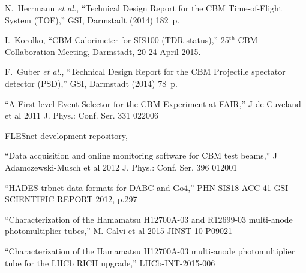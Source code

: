 \begin{thebibliography}{99}
N.~Herrmann {\it et al.}, ``Technical Design Report for the CBM Time-of-Flight System (TOF),'' GSI, Darmstadt (2014) 182~p.

I.~Korolko, ``CBM Calorimeter for SIS100 (TDR status),'' 25$^\mathrm{th}$ CBM Collaboration Meeting, Darmstadt, 20-24 April 2015.\\

F.~Guber {\it et al.}, ``Technical Design Report for the CBM Projectile spectator detector (PSD),'' GSI, Darmstadt (2014) 78~p.



``A First-level Event Selector for the CBM Experiment at FAIR,''
J de Cuveland et al 2011 J. Phys.: Conf. Ser. 331 022006

FLESnet development repository,

``Data acquisition and online monitoring software for CBM test beams,''
J Adamczewski-Musch et al 2012 J. Phys.: Conf. Ser. 396 012001

``HADES trbnet data formats for DABC and Go4,''
PHN-SIS18-ACC-41
GSI SCIENTIFIC REPORT 2012, p.297


``Characterization of the Hamamatsu H12700A-03 and R12699-03 multi-anode photomultiplier tubes,''
M. Calvi et al 2015 JINST 10 P09021 

``Characterization of the Hamamatsu H12700A-03 multi-anode photomultiplier tube for the LHCb RICH upgrade,''
LHCb-INT-2015-006


\end{thebibliography}
